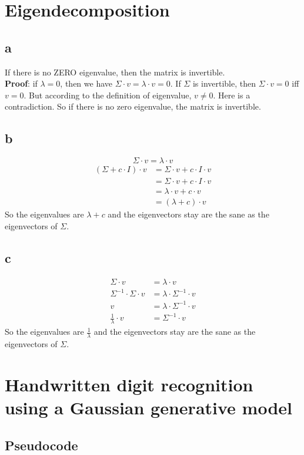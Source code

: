 \documentclass{article}
\begin{document}
\section{Eigendecomposition}
\subsection{a}
If there is no ZERO eigenvalue, then the matrix is invertible.\\
\textbf{Proof}: if $\lambda = 0$, then we have $\Sigma \cdot v = \lambda \cdot v = 0$. If $\Sigma$ is invertible, then $\Sigma \cdot v = 0$ iff $v = 0$. But according to the definition of eigenvalue, $v \neq 0$. Here is a contradiction. So if there is no zero eigenvalue, the matrix is invertible.
\subsection{b}
\[
	\Sigma \cdot v = \lambda \cdot v
\]
\begin{align*} 
	(\Sigma + c \cdot I) \cdot v & = \Sigma \cdot v + c \cdot I \cdot v \\
	& = \Sigma \cdot v + c \cdot I \cdot v \\
	& = \lambda \cdot v + c \cdot v \\
	& = (\lambda + c) \cdot v
\end{align*}
So the eigenvalues are $\lambda + c$ and the eigenvectors stay are the sane as the eigenvectors of $\Sigma$.
\subsection{c}
\begin{align*} 
	\Sigma \cdot v & = \lambda \cdot v \\
	\Sigma^{-1} \cdot \Sigma \cdot v & = \lambda \cdot \Sigma^{-1} \cdot v \\
	v & = \lambda \cdot \Sigma^{-1} \cdot v \\
	\frac{1}{\lambda} \cdot v & = \Sigma^{-1} \cdot v
\end{align*}
So the eigenvalues are $\frac{1}{\lambda}$ and the eigenvectors stay are the sane as the eigenvectors of $\Sigma$.


\section{Handwritten digit recognition using a Gaussian generative model}
\subsection{Pseudocode}
\end{document}
